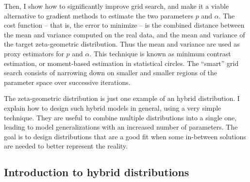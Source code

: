 \documentclass[oneside,10pt]{book}
\begin{document}
Then, I show how to significantly improve grid search, and make it a viable alternative
 to gradient methods to estimate the two parameters $p$ and $\alpha$. The cost function -- that is, the error to minimize -- is the 
 combined distance between the mean and variance computed on the real data, and the mean and variance of the target
 zeta-geometric distribution. Thus the mean and variance are used as proxy estimators for $p$ and $\alpha$. This technique
 is known as minimum contrast estimation, or moment-based estimation in statistical circles. The ``smart'' grid search consists
 of narrowing down on smaller and smaller regions of the parameter space over successive iterations.

The zeta-geometric distribution is just one example of an hybrid distribution. I explain how to design such hybrid models in general, using a very simple technique. They are useful to combine multiple distributions into a single one, leading to model generalizations with an increased number of parameters. The goal is to design distributions that are a good fit when some in-between solutions are needed to better represent the reality.




\subsection{Introduction to hybrid distributions}\label{dk6fb}
\end{document}
